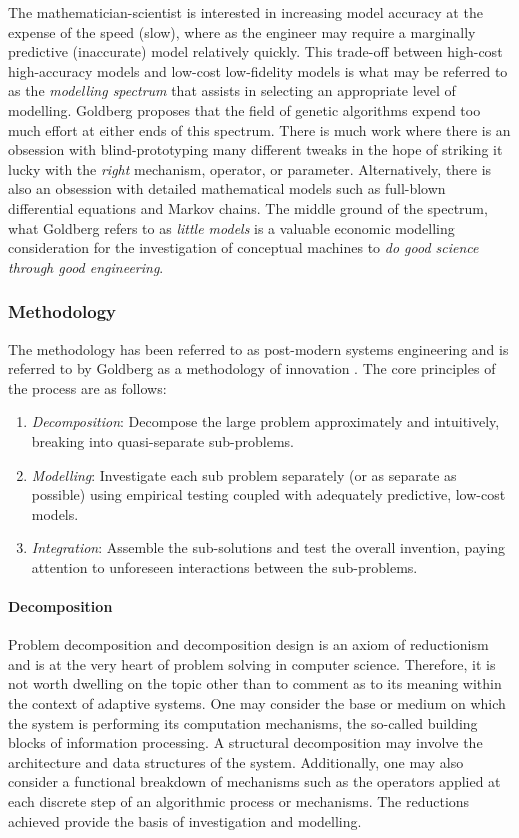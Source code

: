 The mathematician-scientist is interested in increasing model accuracy at the expense of the speed (slow), where as the engineer may require a marginally predictive (inaccurate) model relatively quickly. This trade-off between high-cost high-accuracy models and low-cost low-fidelity models is what may be referred to as the \emph{modelling spectrum} that assists in selecting an appropriate level of modelling. Goldberg proposes that the field of genetic algorithms expend too much effort at either ends of this spectrum. There is much work where there is an obsession with blind-prototyping many different tweaks in the hope of striking it lucky with the \emph{right} mechanism, operator, or parameter. Alternatively, there is also an obsession with detailed mathematical models such as full-blown differential equations and Markov chains. The middle ground of the spectrum, what Goldberg refers to as \emph{little models} is a valuable economic modelling consideration for the investigation of conceptual machines to \emph{do good science through good engineering}. 

%
%
\subsubsection{Methodology}
The methodology has been referred to as post-modern systems engineering and is referred to by Goldberg as a methodology of innovation \cite{Goldberg2004}. The core principles of the process are as follows: 

\begin{enumerate}
	\item \emph{Decomposition}: Decompose the large problem approximately and intuitively, breaking into quasi-separate sub-problems.
	\item \emph{Modelling}: Investigate each sub problem separately (or as separate as possible) using empirical testing coupled with adequately predictive, low-cost models.
	\item \emph{Integration}: Assemble the sub-solutions and test the overall invention, paying attention to unforeseen interactions between the sub-problems.
\end{enumerate}

%
%
\paragraph{Decomposition} Problem decomposition and decomposition design is an axiom of reductionism and is at the very heart of problem solving in computer science. Therefore, it is not worth dwelling on the topic other than to comment as to its meaning within the context of adaptive systems. One may consider the base or medium on which the system is performing its computation mechanisms, the so-called building blocks of information processing. A structural decomposition may involve the architecture and data structures of the system. Additionally, one may also consider a functional breakdown of mechanisms such as the operators applied at each discrete step of an algorithmic process or mechanisms. The reductions achieved provide the basis of investigation and modelling.

